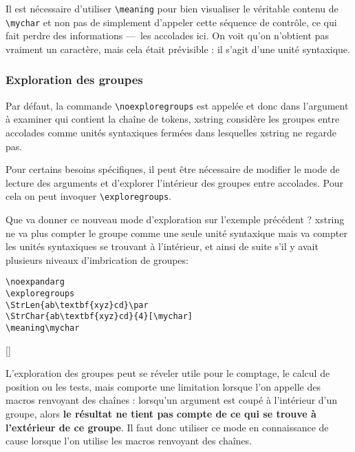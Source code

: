 \documentclass[a4paper,10pt,french]{article}
\newcommand\guill[1]{\og{}#1\fg{}}
\newcommand\US{unité syntaxique\xspace}
\newcommand\USs{unités syntaxiques\xspace}
\newcommand\Xstring{\textsf{xstring}\xspace}
\newcommand\styleexercice{\footnotesize}
\newcommand\verbinline{\lstinline[basicstyle=\normalsize\ttfamily]}
\begin{document}
Il est nécessaire d'utiliser \verb|\meaning| pour bien visualiser le véritable contenu de \verb|\mychar| et non pas de simplement d'appeler cette séquence de contrôle, ce qui fait perdre des informations ---~les accolades ici. On voit qu'on n'obtient pas vraiment un \guill{caractère}, mais cela était prévisible : il s'agit d'une \US.

\subsubsection{Exploration des groupes}
Par défaut, la commande \verbinline|\noexploregroups| est appelée et donc dans l'argument à examiner qui contient la chaîne de tokens, \Xstring considère les groupes entre accolades comme \USs fermées dans lesquelles \Xstring ne regarde pas.

Pour certains besoins spécifiques, il peut être nécessaire de modifier le mode de lecture des arguments et d'explorer l'intérieur des groupes entre accolades. Pour cela on peut invoquer \verbinline|\exploregroups|.\medskip

Que va donner ce nouveau mode d'exploration sur l'exemple précédent ? \Xstring ne va plus compter le groupe comme une seule \US mais va compter les \USs se trouvant à l'intérieur, et ainsi de suite s'il y avait plusieurs niveaux d'imbrication de groupes:

\nobreak\smallskip
\begin{minipage}[c]{0.65\linewidth}
\begin{lstlisting}
\noexpandarg
\exploregroups
\StrLen{ab\textbf{xyz}cd}\par
\StrChar{ab\textbf{xyz}cd}{4}[\mychar]
\meaning\mychar
\end{lstlisting}%
\end{minipage}\hfill
\begin{minipage}[c]{0.35\linewidth}
	\styleexercice
	\noexpandarg
	\exploregroups
	\par
	[\mychar]
	\meaning\mychar
\end{minipage}%
\fullexpandarg\noexploregroups
\medskip

L'exploration des groupes peut se réveler utile pour le comptage, le calcul de position ou les tests, mais comporte une limitation lorsque l'on appelle des macros renvoyant des chaînes : lorsqu'un argument est coupé à l'intérieur d'un groupe, alors \textbf{le résultat ne tient pas compte de ce qui se trouve à l'extérieur de ce groupe}. Il faut donc utiliser ce mode en connaissance de cause lorsque l'on utilise les macros renvoyant des chaînes.
\end{document}
